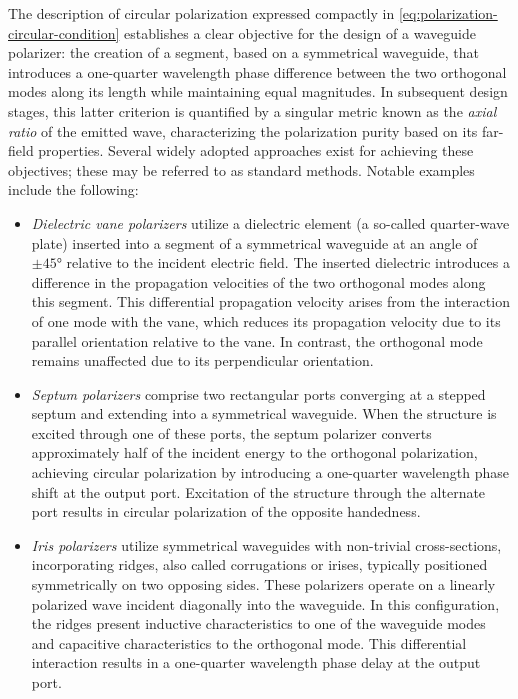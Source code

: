 \documentclass[11pt,a4paper,twoside,openany]{report}
\begin{document}
The description of circular polarization expressed compactly in \cref{eq:polarization-circular-condition} establishes a clear objective for the design of a waveguide polarizer: the creation of a segment, based on a symmetrical waveguide, that introduces a one-quarter wavelength phase difference between the two orthogonal modes along its length while maintaining equal magnitudes. In subsequent design stages, this latter criterion is quantified by a singular metric known as the \emph{axial ratio} of the emitted wave, characterizing the polarization purity based on its far-field properties. Several widely adopted approaches exist for achieving these objectives; these may be referred to as standard methods. Notable examples include the following:
\begin{itemize}
    \item \emph{Dielectric vane polarizers} utilize a dielectric element (a so-called quarter-wave plate) inserted into a segment of a symmetrical waveguide at an angle of $\pm \ang{45}$ relative to the incident electric field. The inserted dielectric introduces a difference in the propagation velocities of the two orthogonal modes along this segment. This differential propagation velocity arises from the interaction of one mode with the vane, which reduces its propagation velocity due to its parallel orientation relative to the vane. In contrast, the orthogonal mode remains unaffected due to its perpendicular orientation.

    \item \emph{Septum polarizers} comprise two rectangular ports converging at a stepped septum and extending into a symmetrical waveguide. When the structure is excited through one of these ports, the septum polarizer converts approximately half of the incident energy to the orthogonal polarization, achieving circular polarization by introducing a one-quarter wavelength phase shift at the output port. Excitation of the structure through the alternate port results in circular polarization of the opposite handedness.

    \item \emph{Iris polarizers} utilize symmetrical waveguides with non-trivial cross-sections, incorporating ridges, also called corrugations or irises, typically positioned symmetrically on two opposing sides. These polarizers operate on a linearly polarized wave incident diagonally into the waveguide. In this configuration, the ridges present inductive characteristics to one of the waveguide modes and capacitive characteristics to the orthogonal mode. This differential interaction results in a one-quarter wavelength phase delay at the output port.
\end{itemize}
\end{document}
